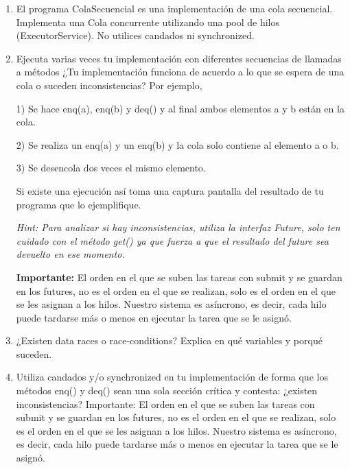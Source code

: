 \begin{enumerate}

\item El programa ColaSecuencial es una implementación de una cola secuencial. Implementa una Cola concurrente utilizando una pool de hilos (ExecutorService). No utilices candados ni synchronized.

\hfill

\item Ejecuta varias veces tu implementación con diferentes secuencias de llamadas a métodos ¿Tu implementación funciona de acuerdo a lo que se espera de una cola o suceden inconsistencias? Por ejemplo,

1) Se hace enq(a), enq(b) y deq() y al final ambos elementos a y b están en la cola.

2) Se realiza un enq(a) y un enq(b) y la cola solo contiene al elemento a o b.

3) Se desencola dos veces el mismo elemento.

Si existe una ejecución así toma una captura pantalla del resultado de tu programa que lo ejemplifique.

\hfill

\textit{Hint: Para analizar si hay inconsistencias, utiliza la interfaz Future, solo ten cuidado con el método get() ya que fuerza a que el resultado del future sea devuelto en ese momento.}

\hfill

\textbf{Importante:} El orden en el que se suben las tareas con submit y se guardan en los futures, no es el orden en el que se realizan, solo es el orden en el que se les asignan a los hilos. Nuestro sistema es asíncrono, es decir, cada hilo puede tardarse más o menos en ejecutar la tarea que se le asignó.

\hfill

\item ¿Existen data races o race-conditions? Explica en qué variables y porqué suceden.

\hfill

\item  Utiliza candados y/o synchronized en tu implementación de forma que los métodos enq() y deq() sean una sola sección crítica y contesta: ¿existen inconsistencias?
Importante: El orden en el que se suben las tareas con submit y se guardan en los futures, no es el orden en el que se realizan, solo es el orden en el que se les asignan a los hilos. Nuestro sistema es asíncrono, es decir, cada hilo puede tardarse más o menos en ejecutar la tarea que se le asignó.


\end{enumerate}
